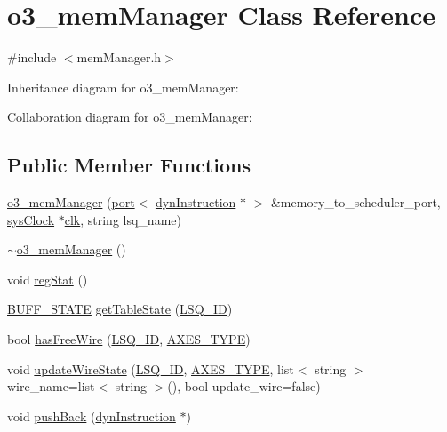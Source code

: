 \hypertarget{classo3__memManager}{
\section{o3\_\-memManager Class Reference}
\label{classo3__memManager}
}


{\ttfamily \#include $<$memManager.h$>$}



Inheritance diagram for o3\_\-memManager:


Collaboration diagram for o3\_\-memManager:
\subsection*{Public Member Functions}
\begin{DoxyCompactItemize}
\item 
\hyperlink{classo3__memManager_adafcb2964b462304f79aa5b2e1992998}{o3\_\-memManager} (\hyperlink{classport}{port}$<$ \hyperlink{classdynInstruction}{dynInstruction} $\ast$ $>$ \&memory\_\-to\_\-scheduler\_\-port, \hyperlink{classsysClock}{sysClock} $\ast$\hyperlink{g__objs_8h_afc4784c140eed1743728e83840e91c12}{clk}, string lsq\_\-name)
\item 
\hyperlink{classo3__memManager_a2e67f82384e5ee8a753332a347eac62f}{$\sim$o3\_\-memManager} ()
\item 
void \hyperlink{classo3__memManager_a4b60f17893db95011c3ff8e6ac4f1724}{regStat} ()
\item 
\hyperlink{global_2global_8h_a8bd4ea2582a6025c1cfe99bf9947489c}{BUFF\_\-STATE} \hyperlink{classo3__memManager_a19302a13552a70cda08814dcfc0daa30}{getTableState} (\hyperlink{global_2global_8h_a3bb5a7f1114a20672e012bf0dfe5fb24}{LSQ\_\-ID})
\item 
bool \hyperlink{classo3__memManager_a65290b7cff22c1fd282d3279f955e41c}{hasFreeWire} (\hyperlink{global_2global_8h_a3bb5a7f1114a20672e012bf0dfe5fb24}{LSQ\_\-ID}, \hyperlink{binaryTranslator_2global_8h_a94b8423a23b95a7adac22848b81e7c0c}{AXES\_\-TYPE})
\item 
void \hyperlink{classo3__memManager_a3481a9cf94186793deb95874d4d25e3d}{updateWireState} (\hyperlink{global_2global_8h_a3bb5a7f1114a20672e012bf0dfe5fb24}{LSQ\_\-ID}, \hyperlink{binaryTranslator_2global_8h_a94b8423a23b95a7adac22848b81e7c0c}{AXES\_\-TYPE}, list$<$ string $>$ wire\_\-name=list$<$ string $>$(), bool update\_\-wire=false)
\item 
void \hyperlink{classo3__memManager_a7bfed5553c2212750ee610da67bc43e7}{pushBack} (\hyperlink{classdynInstruction}{dynInstruction} $\ast$)

\end{DoxyCompactItemize}
